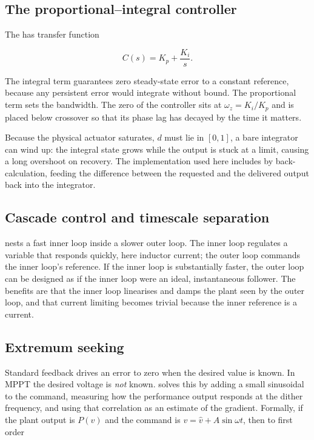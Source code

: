 \subsection{The proportional--integral controller}

The  has transfer function

\begin{equation}
C(s) = K_p + \frac{K_i}{s} .
\label{eq:pi}
\end{equation}

The integral term guarantees zero steady-state error to a constant reference,
because any persistent error would integrate without bound. The proportional
term sets the bandwidth. The zero of the controller sits at $\omega_z = K_i/K_p$
and is placed below crossover so that its phase lag has decayed by the time it
matters.

Because the physical actuator saturates, $d$ must lie in $[0,1]$, a bare
integrator can wind up: the integral state grows while the output is stuck at a
limit, causing a long overshoot on recovery. The implementation used here
includes  by back-calculation, feeding the difference between
the requested and the delivered output back into the integrator.

\subsection{Cascade control and timescale separation}

 nests a fast inner loop inside a slower outer loop. The
inner loop regulates a variable that responds quickly, here inductor current;
the outer loop commands the inner loop's reference. If the inner loop is
substantially faster, the outer loop can be designed as if the inner loop were
an ideal, instantaneous follower. The benefits are that the inner loop linearises
and damps the plant seen by the outer loop, and that current limiting becomes
trivial because the inner reference is a current.

\subsection{Extremum seeking}

Standard feedback drives an error to zero when the desired value is known. In
MPPT the desired voltage is \emph{not} known. 
solves this by adding a small sinusoidal  to the command, measuring
how the performance output responds at the dither frequency, and using that
correlation as an estimate of the gradient. Formally, if the plant output is
$P(v)$ and the command is $v = \hat v + A\sin\omega t$, then to first order

